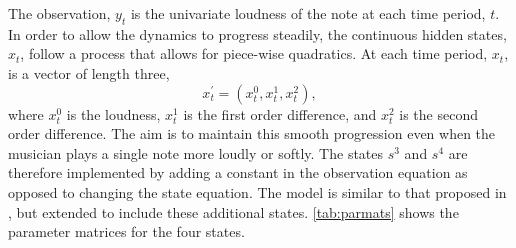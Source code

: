 \documentclass[12pt]{article}
\begin{document}
The observation, \(y_t\) is the univariate loudness of the note at each
time period, \(t\). In order to allow the dynamics to progress steadily,
the continuous hidden states, \(x_t\), follow a process that allows for
piece-wise quadratics. At each time period, \(x_t\), is a vector of
length three, \[x_t^\prime = (x^0_t, x^1_t, x^2_t), \] where \(x^0_t\)
is the loudness, \(x^1_t\) is the first order difference, and \(x^2_t\)
is the second order difference. The aim is to maintain this smooth
progression even when the musician plays a single note more loudly or
softly. The states \(s^3\) and \(s^4\) are therefore implemented by
adding a constant in the observation equation as opposed to changing the
state equation. The model is similar to that proposed in
\cite{gu_modeling_2012}, but extended to include these additional
states. \autoref{tab:parmats} shows the parameter matrices for the four
states.
\end{document}
